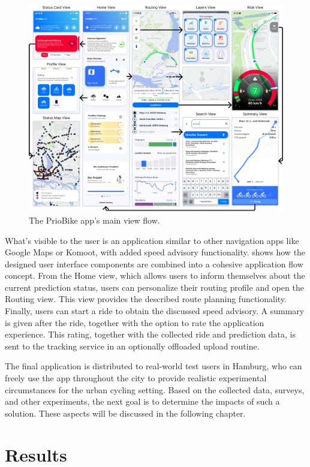 \begin{figure}[htbp]
\caption{The PrioBike app's main view flow.}\label{fig:app}
\includegraphics[width=\linewidth]{images/app.png}
\end{figure}

What's visible to the user is an application similar to other navigation apps like Google Maps or Komoot, with added speed advisory functionality.  shows how the designed user interface components are combined into a cohesive application flow concept. From the Home view, which allows users to inform themselves about the current prediction status, users can personalize their routing profile and open the Routing view. This view provides the described route planning functionality. Finally, users can start a ride to obtain the discussed speed advisory. A summary is given after the ride, together with the option to rate the application experience. This rating, together with the collected ride and prediction data, is sent to the tracking service in an optionally offloaded upload routine.

The final application is distributed to real-world test users in Hamburg, who can freely use the app throughout the city to provide realistic experimental circumstances for the urban cycling setting. Based on the collected data, surveys, and other experiments, the next goal is to determine the impacts of such a solution. These aspects will be discussed in the following chapter.

\section{Results}

